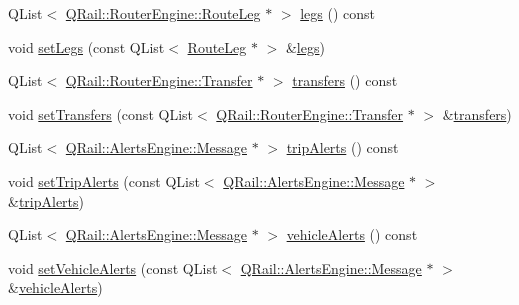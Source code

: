 \begin{DoxyCompactItemize}
Q\+List$<$ \mbox{\hyperlink{classQRail_1_1RouterEngine_1_1RouteLeg}{Q\+Rail\+::\+Router\+Engine\+::\+Route\+Leg}} $\ast$ $>$ \mbox{\hyperlink{classQRail_1_1RouterEngine_1_1Route_aeddeb0a07487274ecae67b4a9aef0701}{legs}} () const
\item 
void \mbox{\hyperlink{classQRail_1_1RouterEngine_1_1Route_af472483ea371f0b6a0fc88c1ea303a49}{set\+Legs}} (const Q\+List$<$ \mbox{\hyperlink{classQRail_1_1RouterEngine_1_1RouteLeg}{Route\+Leg}} $\ast$ $>$ \&\mbox{\hyperlink{classQRail_1_1RouterEngine_1_1Route_aeddeb0a07487274ecae67b4a9aef0701}{legs}})
\item 
Q\+List$<$ \mbox{\hyperlink{classQRail_1_1RouterEngine_1_1Transfer}{Q\+Rail\+::\+Router\+Engine\+::\+Transfer}} $\ast$ $>$ \mbox{\hyperlink{classQRail_1_1RouterEngine_1_1Route_a67674768d1b895227e8fe64d1b3f4e1f}{transfers}} () const
\item 
void \mbox{\hyperlink{classQRail_1_1RouterEngine_1_1Route_a1e1f995678ad634713f038364e48d809}{set\+Transfers}} (const Q\+List$<$ \mbox{\hyperlink{classQRail_1_1RouterEngine_1_1Transfer}{Q\+Rail\+::\+Router\+Engine\+::\+Transfer}} $\ast$ $>$ \&\mbox{\hyperlink{classQRail_1_1RouterEngine_1_1Route_a67674768d1b895227e8fe64d1b3f4e1f}{transfers}})
\item 
Q\+List$<$ \mbox{\hyperlink{classQRail_1_1AlertsEngine_1_1Message}{Q\+Rail\+::\+Alerts\+Engine\+::\+Message}} $\ast$ $>$ \mbox{\hyperlink{classQRail_1_1RouterEngine_1_1Route_ae304c1e025a25cce45d6bbf51d0c8308}{trip\+Alerts}} () const
\item 
void \mbox{\hyperlink{classQRail_1_1RouterEngine_1_1Route_a53b1077306e800418be4923643821179}{set\+Trip\+Alerts}} (const Q\+List$<$ \mbox{\hyperlink{classQRail_1_1AlertsEngine_1_1Message}{Q\+Rail\+::\+Alerts\+Engine\+::\+Message}} $\ast$ $>$ \&\mbox{\hyperlink{classQRail_1_1RouterEngine_1_1Route_ae304c1e025a25cce45d6bbf51d0c8308}{trip\+Alerts}})
\item 
Q\+List$<$ \mbox{\hyperlink{classQRail_1_1AlertsEngine_1_1Message}{Q\+Rail\+::\+Alerts\+Engine\+::\+Message}} $\ast$ $>$ \mbox{\hyperlink{classQRail_1_1RouterEngine_1_1Route_a8cc828d45bd8711e59197002f3881f90}{vehicle\+Alerts}} () const
\item 
void \mbox{\hyperlink{classQRail_1_1RouterEngine_1_1Route_ae902cb90a4a767ab8fa1dc38a6cc8e35}{set\+Vehicle\+Alerts}} (const Q\+List$<$ \mbox{\hyperlink{classQRail_1_1AlertsEngine_1_1Message}{Q\+Rail\+::\+Alerts\+Engine\+::\+Message}} $\ast$ $>$ \&\mbox{\hyperlink{classQRail_1_1RouterEngine_1_1Route_a8cc828d45bd8711e59197002f3881f90}{vehicle\+Alerts}})

\end{DoxyCompactItemize}
